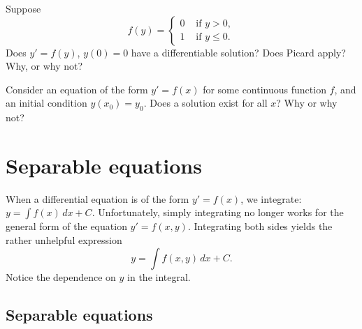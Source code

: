 \begin{exercise}[tricky]
Suppose
\begin{equation*}
f(y) =
\begin{cases}
0 & \text{ if $y > 0$}, \\
1 & \text{ if $y \leq 0$} .
\end{cases}
\end{equation*}
Does $y' = f(y)$, $y(0) = 0$ have a differentiable solution?  Does Picard apply?  Why, or why not?
\end{exercise}

\begin{exercise}
Consider an equation of the form $y' = f(x)$ for some continuous function
$f$, and an initial condition $y(x_0) = y_0$.  Does a
solution exist for all $x$?  Why or why not?
\end{exercise}


\sectionnewpage
\section{Separable equations}
\label{separable:section}



When a differential equation is of the form
$y' = f(x)$,
we integrate:
$y = \int f(x) \,dx + C$.
Unfortunately, simply integrating no longer works for the
general form of the equation
$y' = f(x,y)$.
Integrating both sides yields the rather unhelpful expression
\begin{equation*}
y = \int f(x,y) \,dx + C .
\end{equation*}
Notice the dependence on $y$ in the integral.

\subsection{Separable equations}

